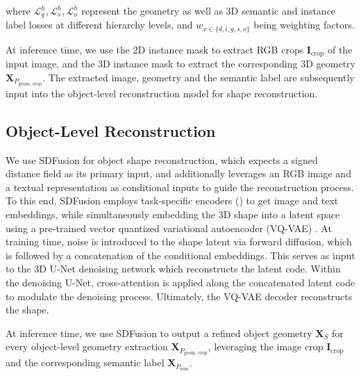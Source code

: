 where $\mathcal{L}_g^h, \mathcal{L}_s^h, \mathcal{L}_o^h$ represent the geometry as well as 3D semantic and instance label losses at different hierarchy levels, and $w_{x\in\{d, i, g, s, o\}}$ being weighting factors.

At inference time, we use the 2D instance mask to extract RGB crops $\mathbf{I}_{\text{crop}}$ of the input image, and the 3D instance mask to extract the corresponding 3D geometry $\textbf{X}_{P_{\text{geom, crop}}}$.
The extracted image, geometry and the semantic label are subsequently input into the object-level reconstruction model for shape reconstruction.

\subsection{Object-Level Reconstruction}

We use SDFusion \citep{cheng2023sdfusion} for object shape reconstruction, which expects a signed distance field as its primary input, and additionally leverages an RGB image and a textual representation as conditional inputs to guide the reconstruction process. To this end, SDFusion employs task-specific encoders (\citep{radford2021learning, devlin2018bert}) to get image and text embeddings, while simultaneously embedding the 3D shape into a latent space using a pre-trained vector quantized variational autoencoder (VQ-VAE) \citep{oord2017neural}. At training time, noise is introduced to the shape latent via forward diffusion, which is followed by a concatenation of the conditional embeddings. This serves as input to the 3D U-Net \citep{cciccek20163d} denoising network which reconstructs the latent code. Within the denoising U-Net, cross-attention is applied along the concatenated latent code to modulate the denoising process. Ultimately, the VQ-VAE decoder reconstructs the shape.

At inference time, we use SDFusion to output a refined object geometry $\mathbf{X}_S$ for every object-level geometry extraction $\mathbf{X}_{P_{\text{geom, crop}}}$, leveraging the image crop $\mathbf{I}_{\text{crop}}$ and the corresponding semantic label $\mathbf{X}_{P_{\text{sem}}}$.


